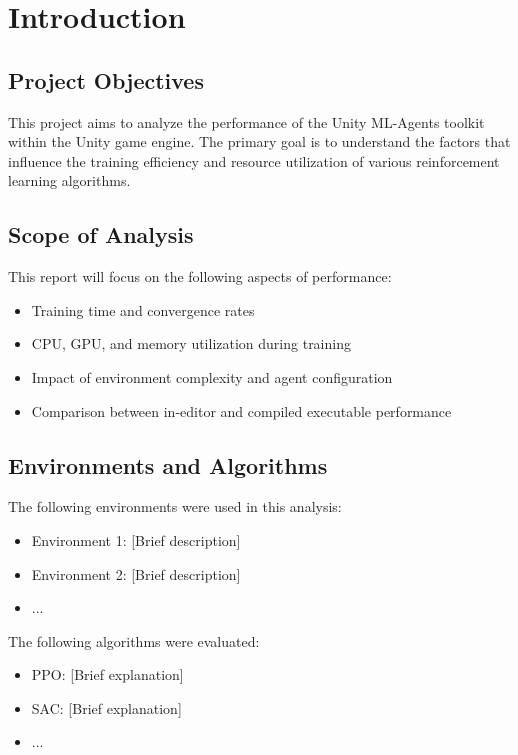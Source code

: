 \section{Introduction}

\subsection{Project Objectives}
This project aims to analyze the performance of the Unity ML-Agents toolkit within the Unity game engine. The primary goal is to understand the factors that influence the training efficiency and resource utilization of various reinforcement learning algorithms.

\subsection{Scope of Analysis}
This report will focus on the following aspects of performance:
\begin{itemize}
    \item Training time and convergence rates
    \item CPU, GPU, and memory utilization during training
    \item Impact of environment complexity and agent configuration
    \item Comparison between in-editor and compiled executable performance
\end{itemize}

\subsection{Environments and Algorithms}
The following environments were used in this analysis:
\begin{itemize}
    \item Environment 1: [Brief description]
    \item Environment 2: [Brief description]
    \item ...
\end{itemize}
The following algorithms were evaluated:
\begin{itemize}
    \item PPO: [Brief explanation]
    \item SAC: [Brief explanation]
    \item ...
\end{itemize}
